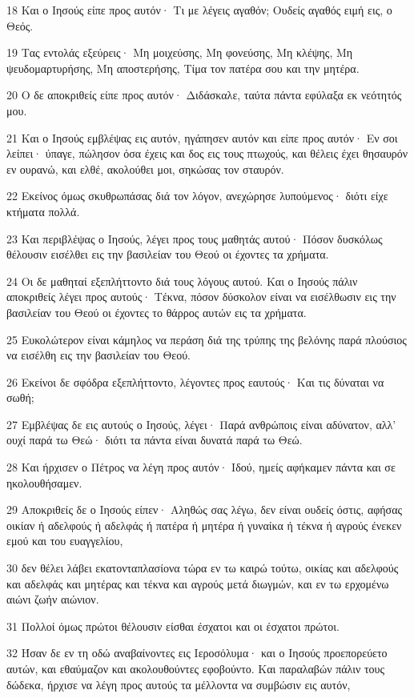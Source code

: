 \par 18 Και ο Ιησούς είπε προς αυτόν· Τι με λέγεις αγαθόν; Ουδείς αγαθός ειμή εις, ο Θεός.
\par 19 Τας εντολάς εξεύρεις· Μη μοιχεύσης, Μη φονεύσης, Μη κλέψης, Μη ψευδομαρτυρήσης, Μη αποστερήσης, Τίμα τον πατέρα σου και την μητέρα.
\par 20 Ο δε αποκριθείς είπε προς αυτόν· Διδάσκαλε, ταύτα πάντα εφύλαξα εκ νεότητός μου.
\par 21 Και ο Ιησούς εμβλέψας εις αυτόν, ηγάπησεν αυτόν και είπε προς αυτόν· Εν σοι λείπει· ύπαγε, πώλησον όσα έχεις και δος εις τους πτωχούς, και θέλεις έχει θησαυρόν εν ουρανώ, και ελθέ, ακολούθει μοι, σηκώσας τον σταυρόν.
\par 22 Εκείνος όμως σκυθρωπάσας διά τον λόγον, ανεχώρησε λυπούμενος· διότι είχε κτήματα πολλά.
\par 23 Και περιβλέψας ο Ιησούς, λέγει προς τους μαθητάς αυτού· Πόσον δυσκόλως θέλουσιν εισέλθει εις την βασιλείαν του Θεού οι έχοντες τα χρήματα.
\par 24 Οι δε μαθηταί εξεπλήττοντο διά τους λόγους αυτού. Και ο Ιησούς πάλιν αποκριθείς λέγει προς αυτούς· Τέκνα, πόσον δύσκολον είναι να εισέλθωσιν εις την βασιλείαν του Θεού οι έχοντες το θάρρος αυτών εις τα χρήματα.
\par 25 Ευκολώτερον είναι κάμηλος να περάση διά της τρύπης της βελόνης παρά πλούσιος να εισέλθη εις την βασιλείαν του Θεού.
\par 26 Εκείνοι δε σφόδρα εξεπλήττοντο, λέγοντες προς εαυτούς· Και τις δύναται να σωθή;
\par 27 Εμβλέψας δε εις αυτούς ο Ιησούς, λέγει· Παρά ανθρώποις είναι αδύνατον, αλλ' ουχί παρά τω Θεώ· διότι τα πάντα είναι δυνατά παρά τω Θεώ.
\par 28 Και ήρχισεν ο Πέτρος να λέγη προς αυτόν· Ιδού, ημείς αφήκαμεν πάντα και σε ηκολουθήσαμεν.
\par 29 Αποκριθείς δε ο Ιησούς είπεν· Αληθώς σας λέγω, δεν είναι ουδείς όστις, αφήσας οικίαν ή αδελφούς ή αδελφάς ή πατέρα ή μητέρα ή γυναίκα ή τέκνα ή αγρούς ένεκεν εμού και του ευαγγελίου,
\par 30 δεν θέλει λάβει εκατονταπλασίονα τώρα εν τω καιρώ τούτω, οικίας και αδελφούς και αδελφάς και μητέρας και τέκνα και αγρούς μετά διωγμών, και εν τω ερχομένω αιώνι ζωήν αιώνιον.
\par 31 Πολλοί όμως πρώτοι θέλουσιν είσθαι έσχατοι και οι έσχατοι πρώτοι.
\par 32 Ήσαν δε εν τη οδώ αναβαίνοντες εις Ιεροσόλυμα· και ο Ιησούς προεπορεύετο αυτών, και εθαύμαζον και ακολουθούντες εφοβούντο. Και παραλαβών πάλιν τους δώδεκα, ήρχισε να λέγη προς αυτούς τα μέλλοντα να συμβώσιν εις αυτόν,
